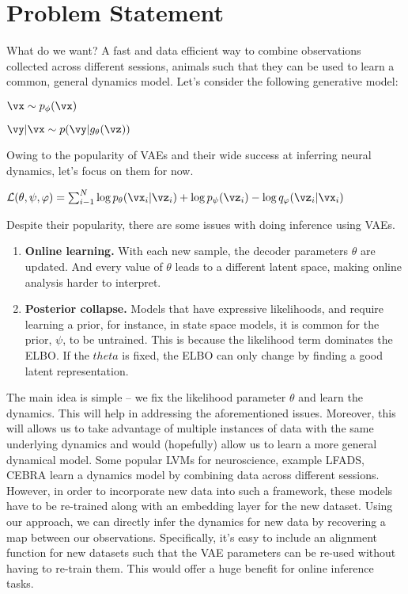 \section{Problem Statement}

What do we want? A fast and data efficient way to combine observations collected across different sessions, animals 
such that they can be used to learn a common, general dynamics model. Let's consider the following generative model:

\begin{center}
$\vx \sim p_{\phi}(\vx)$

$\vy|\vx \sim p(\vy|g_{\theta}(\vz))$
\end{center}

Owing to the popularity of VAEs and their wide success at inferring neural dynamics, let's focus on them for now.

\begin{center}
$ \mathcal{L}(\theta, \psi, \varphi) = \sum_{i-1}^N \log p_{\theta}(\vx_i|\vz_i) + \log p_{\psi}(\vz_i) - \log q_{\varphi} (\vz_i|\vx_i)$
\end{center}

Despite their popularity, there are some issues with doing inference using VAEs. 
\begin{enumerate}
\item{\textbf{Online learning.} With each new sample, the decoder parameters $\theta$ are updated. And every value of $\theta$ leads to a different latent space, making online analysis harder to interpret.}
\item{\textbf{Posterior collapse.} Models that have expressive likelihoods, and require learning a prior, for instance, in state space models, it is common for the prior, $\psi$, to be untrained. This is because the likelihood term dominates the ELBO. If the $theta$ is fixed, the ELBO can only change by finding a good latent representation.} 
\end{enumerate}

The main idea is simple -- we fix the likelihood parameter $\theta$ and learn the dynamics. This will help in addressing the aforementioned issues. Moreover, this will allows us to take advantage of multiple instances of data with the same underlying dynamics and would (hopefully) allow us to learn a more general dynamical model. Some popular LVMs for neuroscience, example LFADS, CEBRA learn a dynamics model by 
combining data across different sessions. However, in order to incorporate new data into such a framework, these models have to be re-trained along with an embedding layer for the new dataset. Using our approach, we can directly infer the dynamics for new data by recovering a map between our observations. Specifically, it's easy to include an alignment function for new datasets such that the VAE parameters can be 
re-used without having to re-train them. This would offer a huge benefit for online inference tasks. 

